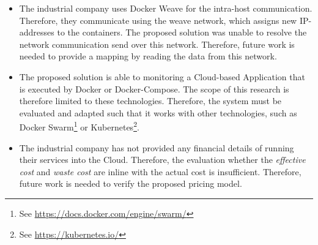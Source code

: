 \begin{itemize}
    \item The industrial company uses Docker Weave for the intra-host communication. Therefore, they communicate using the weave network, which assigns new IP-addresses to the containers. The proposed solution was unable to resolve the network communication send over this network. Therefore, future work is needed to provide a mapping by reading the data from this network.
    \item The proposed solution is able to monitoring a Cloud-based Application that is executed by Docker or Docker-Compose. The scope of this research is therefore limited to these technologies. Therefore, the system must be evaluated and adapted such that it works with other technologies, such as Docker Swarm\footnote{See \url{https://docs.docker.com/engine/swarm/}} or Kubernetes\footnote{See \url{https://kubernetes.io/}}.
    \item The industrial company has not provided any financial details of running their services into the Cloud. Therefore, the evaluation whether the \textit{effective cost} and \textit{waste cost} are inline with the actual cost is insufficient. Therefore, future work is needed to verify the proposed pricing model.
\end{itemize}